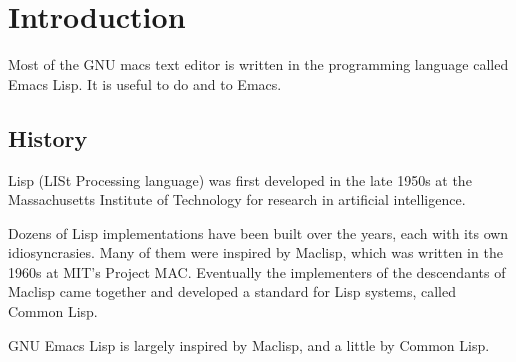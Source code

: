 
\chapter{Introduction}
\label{cha:introduction}

Most of the GNU macs text editor is written in the programming language called Emacs Lisp.
It is useful to do  and  to Emacs.

\section{History}
\label{sec:history}

Lisp (LISt Processing language) was first developed in the late 1950s at the Massachusetts Institute of Technology for research in artificial intelligence.


Dozens of Lisp implementations have been built over the years, each with its own idiosyncrasies.
Many of them were inspired by Maclisp, which was written in the 1960s at MIT’s Project MAC.
Eventually the implementers of the descendants of Maclisp came together and developed a standard for Lisp systems, called Common Lisp.

GNU Emacs Lisp is largely inspired by Maclisp, and a little by Common Lisp.



